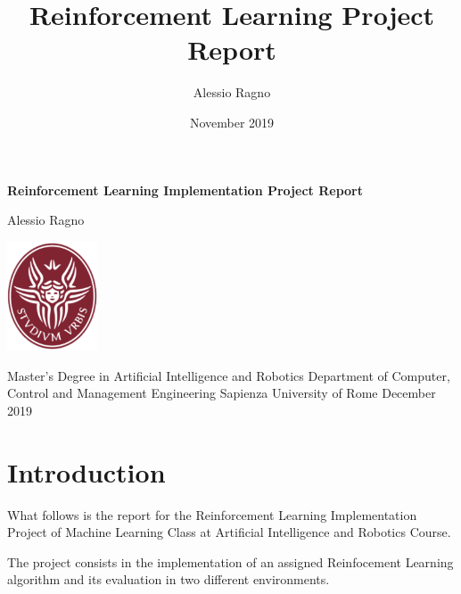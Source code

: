 \documentclass[12pt,a4paper]{article}
\author{Alessio Ragno}
\title{Reinforcement Learning Project Report}
\date{November 2019}
\begin{document}

\begin{titlepage}
    \begin{center}
        \vspace*{1cm}
        
        \huge
        \textbf{Reinforcement Learning Implementation Project Report}
        
        
        \vspace{1.5cm}
        \LARGE
        Alessio Ragno
        
        \vfill
        
        \includegraphics[width=0.2\textwidth]{sapienza_logo.png}


        
        \vfill
        
  

        \vspace{0.5cm}
        
        
        \large
        Master's Degree in Artificial Intelligence and Robotics\break\break
        Department of Computer, Control and Management Engineering\break\break
        Sapienza University of Rome\break\break
        December 2019

    \end{center}
\end{titlepage}



\pagebreak
\tableofcontents
\pagebreak

\section{Introduction}

What follows is the report for the Reinforcement Learning Implementation Project of Machine Learning Class at Artificial Intelligence and Robotics Course.

The project consists in the implementation of an assigned Reinfocement Learning algorithm and its evaluation in two different environments.
\end{document}
